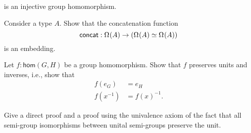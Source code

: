 \begin{exercises}
\begin{subexenum}
    is an injective group homomorphism.
  \item Consider a type $A$. Show that the concatenation function
    \begin{equation*}
      \mathsf{concat}:\Omega^{}(A)\to (\Omega^{}(A)\simeq\Omega^{}(A))
    \end{equation*}
    is an embedding.
  \end{subexenum}
\item Let $f:\mathsf{hom}(G,H)$ be a group homomorphism. Show that $f$ preserves units and inverses, i.e., show that
  \begin{align*}
    f(e_G) & = e_H \\
    f(x^{-1}) & = f(x)^{-1}.
  \end{align*}
\item Give a direct proof and a proof using the univalence axiom of the fact that all semi-group isomorphisms between unital semi-groups preserve the unit.
\end{exercises}
